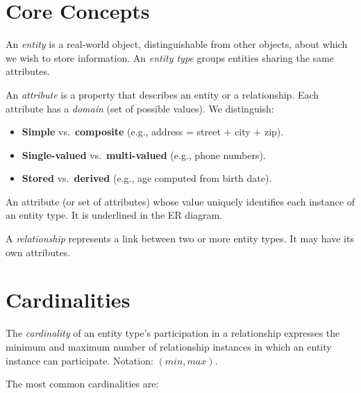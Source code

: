 \section{Core Concepts}

\begin{definition}[Entity]
An \emph{entity} is a real-world object, distinguishable from other objects,
about which we wish to store information. An \emph{entity type} groups
entities sharing the same attributes.
\end{definition}

\begin{definition}[Attribute]
An \emph{attribute} is a property that describes an entity or a relationship.
Each attribute has a \emph{domain} (set of possible values).
We distinguish:
\begin{itemize}
    \item \textbf{Simple} vs.\ \textbf{composite} (e.g., address = street + city + zip).
    \item \textbf{Single-valued} vs.\ \textbf{multi-valued} (e.g., phone numbers).
    \item \textbf{Stored} vs.\ \textbf{derived} (e.g., age computed from birth date).
\end{itemize}
\end{definition}

\begin{definition}
An attribute (or set of attributes) whose value uniquely identifies each
instance of an entity type. It is underlined in the ER diagram.
\end{definition}

\begin{definition}[Relationship]
A \emph{relationship} represents a link between two or more entity types.
It may have its own attributes.
\end{definition}

\section{Cardinalities}

\begin{definition}[Cardinality]
The \emph{cardinality} of an entity type's participation in a relationship
expresses the minimum and maximum number of relationship instances in which
an entity instance can participate. Notation: $(min, max)$.
\end{definition}

The most common cardinalities are:

